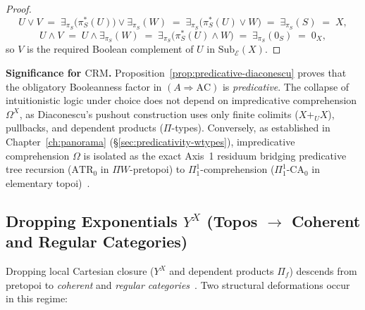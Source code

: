 \documentclass[10pt,twoside,openright]{book}
\theoremstyle{crmplain}
\theoremstyle{crmdef}
\theoremstyle{crmremark}
\begin{document}
\begin{proof}
\[
  U \vee V \;=\; \exists_{\pi_S}\bigl(\pi_S^*(U)\bigr) \vee \exists_{\pi_S}(W) \;=\; \exists_{\pi_S}\bigl(\pi_S^*(U) \vee W\bigr) \;=\; \exists_{\pi_S}(S) \;=\; X,
\]
\[
  U \wedge V \;=\; U \wedge \exists_{\pi_S}(W) \;=\; \exists_{\pi_S}\bigl(\pi_S^*(U) \wedge W\bigr) \;=\; \exists_{\pi_S}(0_S) \;=\; 0_X,
\]
so $V$ is the required Boolean complement of $U$ in $\mathrm{Sub}_{\mathcal{E}}(X)$.
\end{proof}

\textbf{Significance for $\mathrm{CRM}$.} Proposition~\ref{prop:predicative-diaconescu} proves that the obligatory Booleanness factor in $(A \Rightarrow \mathrm{AC})$ is \emph{predicative}. The collapse of intuitionistic logic under choice does not depend on impredicative comprehension $\Omega^X$, as Diaconescu's pushout construction uses only finite colimits ($X +_U X$), pullbacks, and dependent products ($\Pi$-types). Conversely, as established in Chapter~\ref{ch:panorama} (\S\ref{sec:predicativity-wtypes}), impredicative comprehension $\Omega$ is isolated as the exact Axis~1 residuum bridging predicative tree recursion ($\mathrm{ATR}_0$ in $\Pi W$-pretopoi) to $\Pi^1_1$-comprehension ($\Pi^1_1\text{-}\mathrm{CA}_0$ in elementary topoi)~\cite{Maietti05}.

\subsection{\texorpdfstring{Dropping Exponentials $Y^X$ (Topos $\to$ Coherent and Regular Categories)}{Dropping Exponentials YX (Topos -> Coherent and Regular Categories)}}

Dropping local Cartesian closure ($Y^X$ and dependent products $\Pi_f$) descends from pretopoi to \emph{coherent} and \emph{regular categories}~\cite{Johnstone02}. Two structural deformations occur in this regime:
\end{document}
